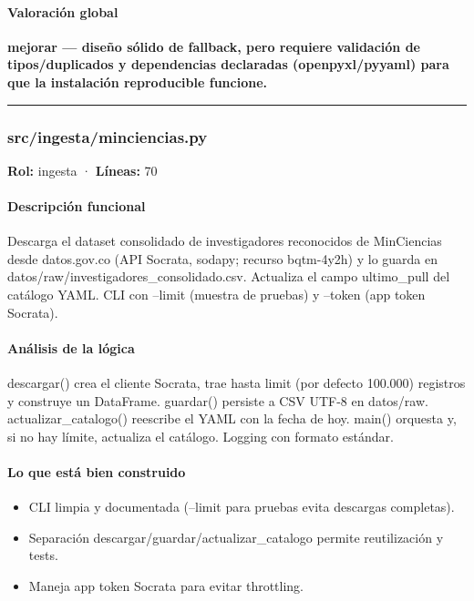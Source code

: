 \paragraph{Valoración global}
\textbf{mejorar --- diseño sólido de fallback, pero requiere validación de tipos/duplicados y dependencias declaradas (openpyxl/pyyaml) para que la instalación reproducible funcione.}

\medskip
\hrule

\subsubsection{src/ingesta/minciencias.py}
\textbf{Rol:} ingesta · \textbf{Líneas:} 70

\paragraph{Descripción funcional}
Descarga el dataset consolidado de investigadores reconocidos de MinCiencias desde datos.gov.co (API Socrata, sodapy; recurso bqtm-4y2h) y lo guarda en datos/raw/investigadores\_consolidado.csv. Actualiza el campo ultimo\_pull del catálogo YAML. CLI con --limit (muestra de pruebas) y --token (app token Socrata).

\paragraph{Análisis de la lógica}
descargar() crea el cliente Socrata, trae hasta limit (por defecto 100.000) registros y construye un DataFrame. guardar() persiste a CSV UTF-8 en datos/raw. actualizar\_catalogo() reescribe el YAML con la fecha de hoy. main() orquesta y, si no hay límite, actualiza el catálogo. Logging con formato estándar.

\paragraph{Lo que está bien construido}
\begin{itemize}
  \item CLI limpia y documentada (--limit para pruebas evita descargas completas).
  \item Separación descargar/guardar/actualizar\_catalogo permite reutilización y tests.
  \item Maneja app token Socrata para evitar throttling.
\end{itemize}

